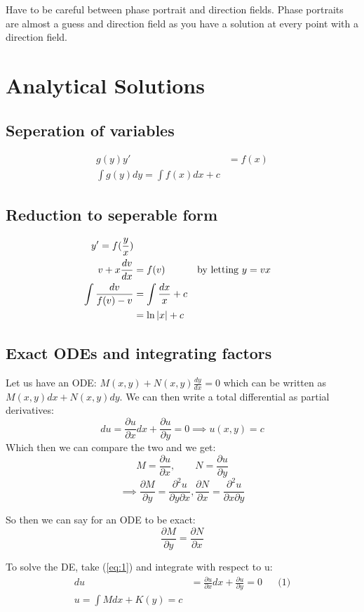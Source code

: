\documentclass{article}
\newcommand{\di}{\frac{dy}{dx}}
\newcommand{\pd}[2]{\frac{\partial#1}{\partial#2}}
\begin{document}
Have to be careful between phase portrait and direction fields. Phase portraits are almost a guess and direction field as you have a solution at every point with a direction field.

\section{Analytical Solutions}

\subsection{Seperation of variables}

\begin{align*}
  g(y)y' &= f(x)\\
  \int g(y)dy = \int f(x)dx + c
\end{align*}

\subsection{Reduction to seperable form}

\begin{align*}
  y' = f(\frac{y}{x})\\
  v + x \frac{dv}{dx} &= f(v) && \text{by letting $ y = vx$}\\
  \int \frac{dv}{f(v) - v} &= \int \frac{dx}{x} + c\\
  &= \ln |x| + c\\
\end{align*}

\subsection{Exact ODEs and integrating factors}

Let us have an ODE: $M(x, y) + N(x, y)\di = 0$ which can be written as $M(x, y)dx + N(x, y)dy$. We can then write a total differential as partial derivatives:
\begin{equation}  \label{eq:1}
  du = \pd{u}{x} dx + \pd{u}{y} = 0 \implies u(x, y) = c
\end{equation}
Which then we can compare the two and we get:
$$ M = \pd{u}{x}, \qquad N = \pd{u}{y} $$ $$\implies \pd{M}{y} = \frac{\partial^2u}{\partial y \partial x}, \pd{N}{x} = \frac{\partial^2u}{\partial x \partial y} $$

So then we can say for an ODE to be exact:
$$ \pd{M}{y} = \pd{N}{x} $$

To solve the DE, take (\ref{eq:1}) and integrate with respect to u:
\begin{align*}
  du &= \pd{u}{x} dx + \pd{u}{y} = 0 && \text{(1)}\\
  u = \int M dx + K(y)= c \\
\end{align*}
\end{document}
